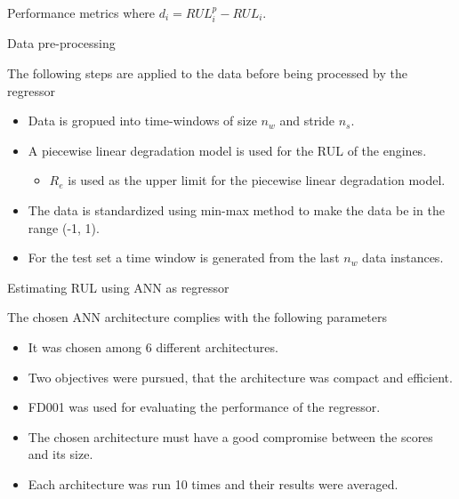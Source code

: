 \documentclass{beamer}
\begin{document}
\begin{darkframes}
\begin{frame}{Performance metrics}
	where $d_i = RUL_i^p - RUL_i$.      
      
    \end{frame}
    
	\begin{frame}{Data pre-processing}
      
      The following steps are applied to the data before being processed by the regressor

	 \begin{itemize}
	  \item Data is gropued into time-windows of size $n_w$ and stride $n_s$.
	  \item A piecewise linear degradation model is used for the RUL of the engines.
	  \begin{itemize}
	  	\item $R_e$ is used as the upper limit for the piecewise linear degradation model.
	  \end{itemize}
	  \item The data is standardized using min-max method to make the data be in the range (-1, 1).
	  \item For the test set a time window is generated from the last $n_w$ data instances.
	\end{itemize}	       
      
    \end{frame} 
    
    \begin{frame}{Estimating RUL using ANN as regressor}
      
	The chosen ANN architecture complies with the following parameters    
      
	\begin{itemize}
	\item It was chosen among 6 different architectures.
	\item Two objectives were pursued, that the architecture was compact and efficient.
	\item FD001 was used for evaluating the performance of the regressor.
	\item The chosen architecture must have a good compromise between the scores and its size.
	\item Each architecture was run 10 times and their results were averaged.
	\end{itemize}	      
     
     \end{frame}
     

\end{darkframes}
\end{document}
